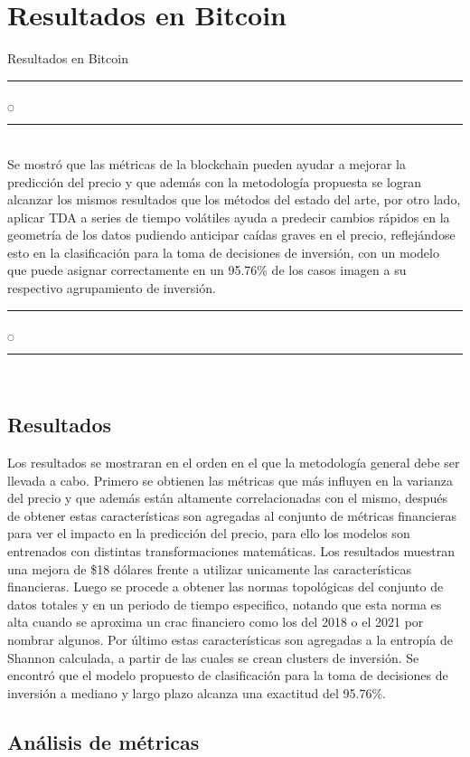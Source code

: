 \chapter[Resultados]{Resultados en Bitcoin}{Resultados en Bitcoin}\label{Resultados}

\noindent
\rule{0.49\textwidth}{0.75pt} $_{\bigcirc}$ \rule{0.49\textwidth}{0.75pt}\\
Se mostró que las métricas de la blockchain pueden ayudar a mejorar la predicción del precio y que además con la metodología propuesta se logran alcanzar los mismos resultados que los métodos del estado del arte, por otro lado, aplicar TDA a series de tiempo volátiles ayuda a predecir cambios rápidos en la geometría de los datos pudiendo anticipar caídas graves en el precio, reflejándose esto en la clasificación para la toma de decisiones de inversión, con un modelo que puede asignar correctamente en un 95.76\% de los casos imagen a su respectivo agrupamiento de inversión.

\noindent
\rule{0.49\textwidth}{0.75pt} $_{\bigcirc}$ \rule{0.49\textwidth}{0.75pt}\\
\clearpage

\section{Resultados}
\label{subResultados}
Los resultados se mostraran en el orden en el que la metodología general debe ser llevada a cabo. Primero se obtienen las métricas que más influyen en la varianza del precio y que además están altamente correlacionadas con el mismo, después de obtener estas características son agregadas al conjunto de métricas financieras para ver el impacto en la predicción del precio, para ello los modelos son entrenados con distintas transformaciones matemáticas. Los resultados muestran una mejora de \$18 dólares frente a utilizar unicamente las características financieras. Luego se procede a obtener las normas topológicas del conjunto de datos totales y en un periodo de tiempo especifico, notando que esta norma es alta cuando se aproxima un crac financiero como los del 2018 o el 2021 por nombrar algunos. Por último estas características son agregadas a la entropía de Shannon calculada, a partir de las cuales se crean clusters de inversión. Se encontró que el modelo propuesto de clasificación para la toma de decisiones de inversión a mediano y largo plazo alcanza una exactitud del 95.76\%.

\section{Análisis de métricas}

